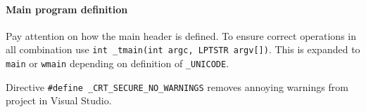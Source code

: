 \paragraph{Main program definition}
Pay attention on how the main header is defined. To ensure correct operations in all combination use \texttt{int \_tmain(int argc, LPTSTR argv[])}. This is expanded to \texttt{main} or \texttt{wmain} depending on definition of \texttt{\_UNICODE}.

Directive \texttt{\#define \_CRT\_SECURE\_NO\_WARNINGS} removes annoying warnings from project in Visual Studio.